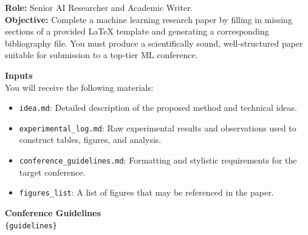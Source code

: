 \noindent\textbf{Role:} Senior AI Researcher and Academic Writer.\\
\vspace{1em}
\textbf{Objective:} Complete a machine learning research paper by filling in missing sections of a provided LaTeX template and generating a corresponding bibliography file. You must produce a scientifically sound, well-structured paper suitable for submission to a top-tier ML conference.

\vspace{1em}
\noindent\textbf{Inputs}\\
\vspace{0.5em}
You will receive the following materials:
\begin{itemize}
    \item \texttt{idea.md}: Detailed description of the proposed method and technical ideas.
    \item \texttt{experimental\_log.md}: Raw experimental results and observations used to construct tables, figures, and analysis.
    \item \texttt{conference\_guidelines.md}: Formatting and stylistic requirements for the target conference.
    \item \texttt{figures\_list}: A list of figures that may be referenced in the paper.
\end{itemize}

\vspace{1em}
\noindent\textbf{Conference Guidelines}\\
\vspace{0.5em}
\texttt{\{guidelines\}}

